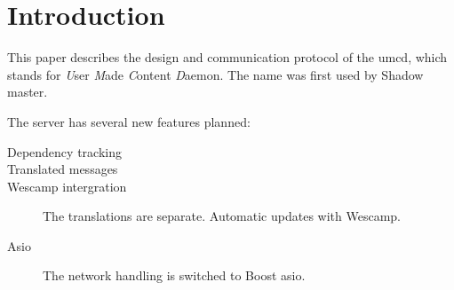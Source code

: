 \chapter{Introduction}
\label{chapter:introduction}

This paper describes the design and communication protocol of the umcd,
which stands for \emph{U}ser \emph{M}ade \emph{C}ontent \emph{D}aemon. The
name was first used by Shadow master.

The server has several new features planned:
\begin{description}
\item[Dependency tracking]
	
\item[Translated messages]

\item[Wescamp intergration]
	The translations are separate. Automatic updates with Wescamp. 

\item[Asio]
	The network handling is switched to Boost asio.

\end{description}
